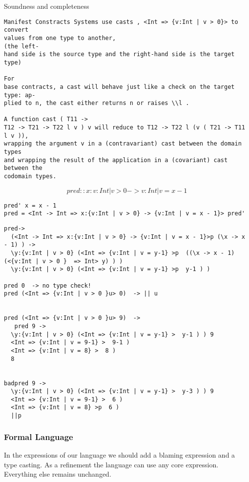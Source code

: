 Soundness and completeness \cite{BlumeM06}

\begin{verbatim}
Manifest Constracts Systems use casts , <Int => {v:Int | v > 0}> to convert 
values from one type to another,
(the left-
hand side is the source type and the right-hand side is the target type)

For
base contracts, a cast will behave just like a check on the target type: ap-
plied to n, the cast either returns n or raises \\l . 

A function cast ( T11 ->
T12 -> T21 -> T22 l v ) v will reduce to T12 -> T22 l (v ( T21 -> T11 l v )),
wrapping the argument v in a (contravariant) cast between the domain types
and wrapping the result of the application in a (covariant) cast between the
codomain types.

\end{verbatim}


$$
pred ::x:{v:Int | v > 0} -> {v:Int | v = x - 1} 
$$
\begin{verbatim}
pred' x = x - 1
pred = <Int -> Int => x:{v:Int | v > 0} -> {v:Int | v = x - 1}> pred'
\end{verbatim}

\begin{verbatim}
pred-> 
  (<Int -> Int => x:{v:Int | v > 0} -> {v:Int | v = x - 1}>p (\x -> x - 1) ) ->  
  \y:{v:Int | v > 0} (<Int => {v:Int | v = y-1} >p  ((\x -> x - 1) (<{v:Int | v > 0 }  => Int> y) ) ) 
  \y:{v:Int | v > 0} (<Int => {v:Int | v = y-1} >p  y-1 ) ) 
  
pred 0  -> no type check!
pred (<Int => {v:Int | v > 0 }u> 0)  -> || u


pred (<Int => {v:Int | v > 0 }u> 9)  -> 
   pred 9 -> 
  \y:{v:Int | v > 0} (<Int => {v:Int | v = y-1} >  y-1 ) ) 9
  <Int => {v:Int | v = 9-1} >  9-1 )
  <Int => {v:Int | v = 8} >  8 )
  8


badpred 9 -> 
  \y:{v:Int | v > 0} (<Int => {v:Int | v = y-1} >  y-3 ) ) 9
  <Int => {v:Int | v = 9-1} >  6 )
  <Int => {v:Int | v = 8} >p  6 )
  ||p

\end{verbatim}

\subsubsection{Formal Language}

In the expressions of our language we should add a blaming expression
and a type casting.
As a refinement the language can use any core expression.
Everything else remains unchanged.


